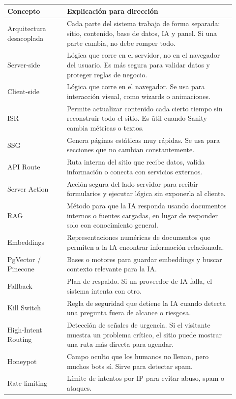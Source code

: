 \documentclass[11pt,letterpaper]{article}
\begin{document}
\begin{longtable}{p{0.24\linewidth}p{0.68\linewidth}}
\toprule
\textbf{Concepto} & \textbf{Explicaci\'on para direcci\'on} \\
\midrule
Arquitectura desacoplada & Cada parte del sistema trabaja de forma separada: sitio, contenido, base de datos, IA y panel. Si una parte cambia, no debe romper todo. \\
Server-side & L\'ogica que corre en el servidor, no en el navegador del usuario. Es m\'as segura para validar datos y proteger reglas de negocio. \\
Client-side & L\'ogica que corre en el navegador. Se usa para interacci\'on visual, como wizards o animaciones. \\
ISR & Permite actualizar contenido cada cierto tiempo sin reconstruir todo el sitio. Es \~util cuando Sanity cambia m\'etricas o textos. \\
SSG & Genera p\'aginas est\'aticas muy r\'apidas. Se usa para secciones que no cambian constantemente. \\
API Route & Ruta interna del sitio que recibe datos, valida informaci\'on o conecta con servicios externos. \\
Server Action & Acci\'on segura del lado servidor para recibir formularios y ejecutar l\'ogica sin exponerla al cliente. \\
RAG & M\'etodo para que la IA responda usando documentos internos o fuentes cargadas, en lugar de responder solo con conocimiento general. \\
Embeddings & Representaciones num\'ericas de documentos que permiten a la IA encontrar informaci\'on relacionada. \\
PgVector / Pinecone & Bases o motores para guardar embeddings y buscar contexto relevante para la IA. \\
Fallback & Plan de respaldo. Si un proveedor de IA falla, el sistema intenta con otro. \\
Kill Switch & Regla de seguridad que detiene la IA cuando detecta una pregunta fuera de alcance o riesgosa. \\
High-Intent Routing & Detecci\'on de se\~nales de urgencia. Si el visitante muestra un problema cr\'itico, el sitio puede mostrar una ruta m\'as directa para agendar. \\
Honeypot & Campo oculto que los humanos no llenan, pero muchos bots s\'i. Sirve para detectar spam. \\
Rate limiting & L\'imite de intentos por IP para evitar abuso, spam o ataques. \\

\end{longtable}
\end{document}
